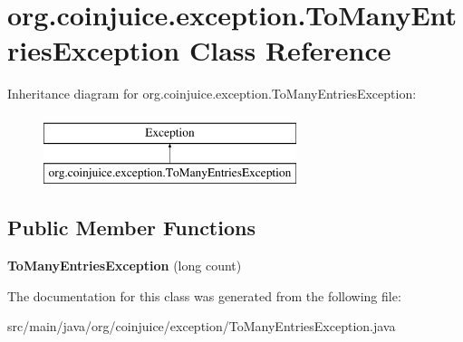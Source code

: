 \hypertarget{classorg_1_1coinjuice_1_1exception_1_1_to_many_entries_exception}{\section{org.\-coinjuice.\-exception.\-To\-Many\-Entries\-Exception Class Reference}
\label{classorg_1_1coinjuice_1_1exception_1_1_to_many_entries_exception}
}
Inheritance diagram for org.\-coinjuice.\-exception.\-To\-Many\-Entries\-Exception\-:\begin{figure}[H]
\begin{center}
\leavevmode
\includegraphics[height=2.000000cm]{classorg_1_1coinjuice_1_1exception_1_1_to_many_entries_exception}
\end{center}
\end{figure}
\subsection*{Public Member Functions}
\begin{DoxyCompactItemize}
\item 
\hypertarget{classorg_1_1coinjuice_1_1exception_1_1_to_many_entries_exception_a7da48dfcf69ef31fd72774e99cf4bf2e}{{\bfseries To\-Many\-Entries\-Exception} (long count)}\label{classorg_1_1coinjuice_1_1exception_1_1_to_many_entries_exception_a7da48dfcf69ef31fd72774e99cf4bf2e}

\end{DoxyCompactItemize}


The documentation for this class was generated from the following file\-:\begin{DoxyCompactItemize}
\item 
src/main/java/org/coinjuice/exception/To\-Many\-Entries\-Exception.\-java\end{DoxyCompactItemize}
